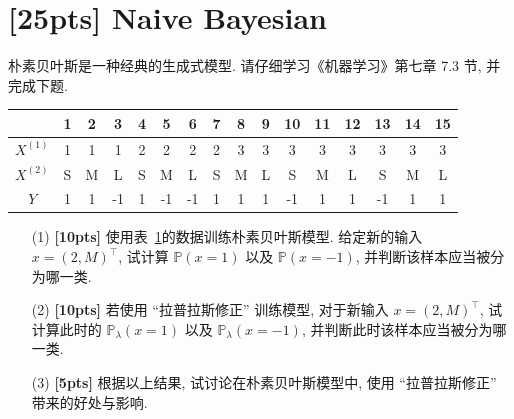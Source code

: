\documentclass[a4paper,UTF8]{article}
\numberwithin{equation}{section}
\theoremstyle{definition}
\begin{document}
  \section{[25pts] Naive Bayesian}
朴素贝叶斯是一种经典的生成式模型. 请仔细学习《机器学习》第七章 7.3 节, 并完成下题. 

\begin{table}[H]
\label{tab:data1}
\centering
\begin{tabular}{c|*{15}{c}}
    \hline
   & 1 & 2 & 3 & 4 & 5 & 6 & 7 & 8 & 9 & 10 & 11 & 12 & 13 & 14 & 15 \\
  \hline
  $X^{(1)}$ & 1 & 1 & 1 & 2 & 2 & 2 & 2 & 3 & 3 & 3 & 3 & 3 & 3 & 3 & 3 \\
  $X^{(2)}$ & S & M & L & S & M & L & S & M & L & S & M & L & S & M & L \\
  $Y$ & 1 & 1 & -1 & 1 & -1 & -1 & 1 & 1 & 1 & -1 & 1 & 1 & -1 & 1 & 1 \\
  \hline
\end{tabular}
\end{table}       
\begin{enumerate}
    \item[(1)] \textbf{[10pts]} 使用表~\ref{tab:data1}的数据训练朴素贝叶斯模型. 给定新的输入 $x = (2, M)^\top$, 试计算 $\mathbb{P}(x=1)$ 以及 $\mathbb{P}(x=-1)$, 并判断该样本应当被分为哪一类.
    \item[(2)] \textbf{[10pts]} 若使用 “拉普拉斯修正” 训练模型, 对于新输入 $x = (2, M)^\top$, 试计算此时的 $\mathbb{P}_\lambda (x=1)$ 以及 $\mathbb{P}_\lambda (x=-1)$, 并判断此时该样本应当被分为哪一类. 
    \item[(3)] \textbf{[5pts]} 根据以上结果, 试讨论在朴素贝叶斯模型中, 使用 “拉普拉斯修正” 带来的好处与影响.
\end{enumerate}
\end{document}
